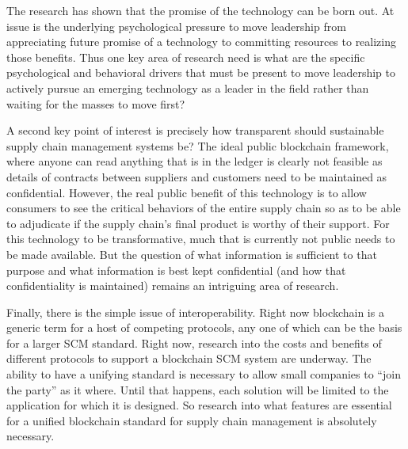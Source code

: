 \documentclass[man]{apa7}
\begin{document}
The research has shown that the promise of the technology can be born out. At
issue is the underlying psychological pressure to move leadership from
appreciating future promise of a technology to committing resources to realizing
those benefits. Thus one key area of research need is what are the specific
psychological and behavioral drivers that must be present to move leadership
to actively pursue an emerging technology as a leader in the field rather than
waiting for the masses to move first? 

A second key point of interest is precisely how transparent should sustainable
supply chain management systems be? The ideal public blockchain framework, where
anyone can read anything that is in the ledger is clearly not feasible as
details of contracts between suppliers and customers need to be maintained as
confidential. However, the real public benefit of this technology is to allow
consumers to see the critical behaviors of the entire supply chain so as to be
able to adjudicate if the supply chain's final product is worthy of their
support. For this technology to be transformative, much that is currently not
public needs to be made available. But the question of what information is
sufficient to that purpose and what information is best kept confidential (and
how that confidentiality is maintained) remains an intriguing area of research.

Finally, there is the simple issue of interoperability. Right now blockchain is
a generic term for a host of competing protocols, any one of which can be the
basis for a larger SCM standard. Right now, research into the costs and benefits of
different protocols to support a blockchain SCM system are underway. The ability
to have a unifying standard is necessary to allow small companies to ``join the
party'' as it where. Until that happens, each solution will be limited to the
application for which it is designed. So research into what features are
essential for a unified blockchain standard for supply chain management is
absolutely necessary. 







\printbibliography
\end{document}
